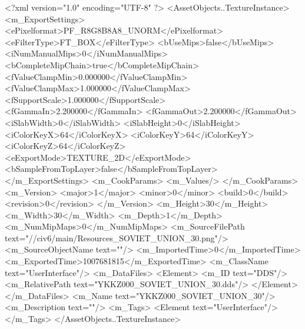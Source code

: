 <?xml version="1.0" encoding="UTF-8" ?>
<AssetObjects..TextureInstance>
	<m_ExportSettings>
		<ePixelformat>PF_R8G8B8A8_UNORM</ePixelformat>
		<eFilterType>FT_BOX</eFilterType>
		<bUseMips>false</bUseMips>
		<iNumManualMips>0</iNumManualMips>
		<bCompleteMipChain>true</bCompleteMipChain>
		<fValueClampMin>0.000000</fValueClampMin>
		<fValueClampMax>1.000000</fValueClampMax>
		<fSupportScale>1.000000</fSupportScale>
		<fGammaIn>2.200000</fGammaIn>
		<fGammaOut>2.200000</fGammaOut>
		<iSlabWidth>0</iSlabWidth>
		<iSlabHeight>0</iSlabHeight>
		<iColorKeyX>64</iColorKeyX>
		<iColorKeyY>64</iColorKeyY>
		<iColorKeyZ>64</iColorKeyZ>
		<eExportMode>TEXTURE_2D</eExportMode>
		<bSampleFromTopLayer>false</bSampleFromTopLayer>
	</m_ExportSettings>
	<m_CookParams>
		<m_Values/>
	</m_CookParams>
	<m_Version>
		<major>1</major>
		<minor>0</minor>
		<build>0</build>
		<revision>0</revision>
	</m_Version>
	<m_Height>30</m_Height>
	<m_Width>30</m_Width>
	<m_Depth>1</m_Depth>
	<m_NumMipMaps>0</m_NumMipMaps>
	<m_SourceFilePath text="//civ6/main/Resources_SOVIET_UNION_30.png"/>
	<m_SourceObjectName text=""/>
	<m_ImportedTime>0</m_ImportedTime>
	<m_ExportedTime>1007681815</m_ExportedTime>
	<m_ClassName text="UserInterface"/>
	<m_DataFiles>
		<Element>
			<m_ID text="DDS"/>
			<m_RelativePath text="YKKZ000_SOVIET_UNION_30.dds"/>
		</Element>
	</m_DataFiles>
	<m_Name text="YKKZ000_SOVIET_UNION_30"/>
	<m_Description text=""/>
	<m_Tags>
		<Element text="UserInterface"/>
	</m_Tags>
</AssetObjects..TextureInstance>

